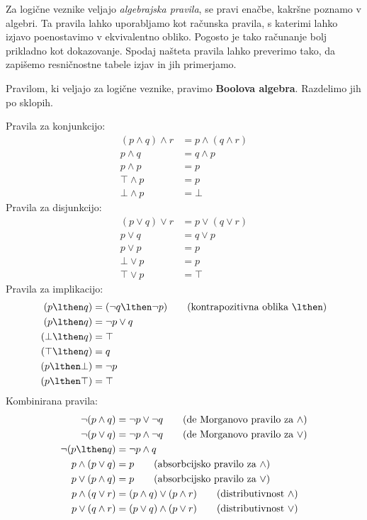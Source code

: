 Za logične veznike veljajo \emph{algebrajska pravila}, se pravi enačbe, kakršne poznamo v algebri. Ta pravila lahko uporabljamo kot računska pravila, s katerimi lahko izjavo poenostavimo v ekvivalentno obliko. Pogosto je tako računanje bolj prikladno kot dokazovanje. Spodaj našteta pravila lahko preverimo tako, da zapišemo resničnostne tabele izjav in jih primerjamo.

Pravilom, ki veljajo za logične veznike, pravimo \textbf{Boolova algebra}.
Razdelimo jih po sklopih.

Pravila za konjunkcijo:
%
\begin{align}
  (p \land q) \land r &= p \land (q \land r) \tag{asociativnost $\land$} \\
  p \land q &= q \land p \tag{komutativnost $\land$} \\
  p \land p &= p \tag{idempotentnost $\land$} \\
  \top \land p &= p \tag{$\top$ je nevtralen za $\land$} \\
  \bot \land p &= \bot \tag{$\bot$ absorbira $\land$}
\end{align}
%
Pravila za disjunkcijo:
%
\begin{align}
  (p \lor q) \lor r &= p \lor (q \lor r) \tag{asociativnost $\lor$} \\
  p \lor q &= q \lor p \tag{komutativnost $\lor$} \\
  p \lor p &= p \tag{idempotentnost $\lor$} \\
  \bot \lor p &= p \tag{$\bot$ je nevtralen za $\lor$} \\
  \top \lor p &= \top \tag{$\top$ absorbira $\lor$}
\end{align}
%
Pravila za implikacijo:
%
\begin{align}
  (p \lthen q) &= (\neg q \lthen \neg p) \tag{kontrapozitivna oblika $\lthen$}\\
  (p \lthen q) &= \neg p \lor q \notag \\
  (\bot \lthen q) &= \top \notag \\
  (\top \lthen q) &= q \notag \\
  (p \lthen \bot) &= \neg p \notag \\
  (p \lthen \top) &= \top \notag
\end{align}
%
Kombinirana pravila:
%
\begin{align}
  \neg(p \land q) &= \neg p \lor \neg q \tag{de Morganovo pravilo za $\land$} \\
  \neg(p \lor q) &= \neg p \land \neg q \tag{de Morganovo pravilo za $\lor$} \\
  \neg(p \lthen q) &= \neg p \land q \notag \\
  p \land (p \lor q) &= p \tag{absorbcijsko pravilo za $\land$}\\
  p \lor (p \land q) &= p \tag{absorbcijsko pravilo za $\lor$} \\
  p \land (q \lor r) &= (p \land q) \lor (p \land r) \tag{distributivnost $\land$}\\
  p \lor (q \land r) &= (p \lor q) \land (p \lor r) \tag{distributivnost $\lor$}
\end{align}
